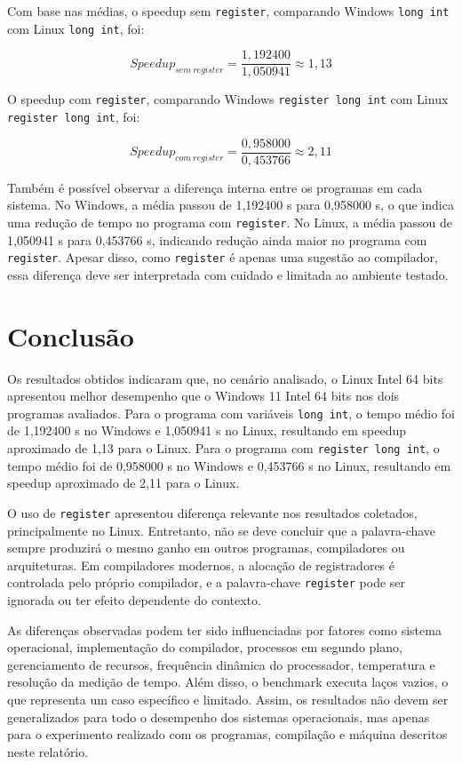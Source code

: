 \documentclass[12pt,oneside,a4paper,brazil]{abntex2}
\begin{document}
Com base nas médias, o speedup sem \texttt{register}, comparando Windows \texttt{long int} com Linux \texttt{long int}, foi:

\begin{equation}
Speedup_{sem\ register} = \frac{1,192400}{1,050941} \approx 1,13
\end{equation}

O speedup com \texttt{register}, comparando Windows \texttt{register long int} com Linux \texttt{register long int}, foi:

\begin{equation}
Speedup_{com\ register} = \frac{0,958000}{0,453766} \approx 2,11
\end{equation}

Também é possível observar a diferença interna entre os programas em cada sistema. No Windows, a média passou de 1,192400 s para 0,958000 s, o que indica uma redução de tempo no programa com \texttt{register}. No Linux, a média passou de 1,050941 s para 0,453766 s, indicando redução ainda maior no programa com \texttt{register}. Apesar disso, como \texttt{register} é apenas uma sugestão ao compilador, essa diferença deve ser interpretada com cuidado e limitada ao ambiente testado.

\chapter{Conclusão}

Os resultados obtidos indicaram que, no cenário analisado, o Linux Intel 64 bits apresentou melhor desempenho que o Windows 11 Intel 64 bits nos dois programas avaliados. Para o programa com variáveis \texttt{long int}, o tempo médio foi de 1,192400 s no Windows e 1,050941 s no Linux, resultando em speedup aproximado de 1,13 para o Linux. Para o programa com \texttt{register long int}, o tempo médio foi de 0,958000 s no Windows e 0,453766 s no Linux, resultando em speedup aproximado de 2,11 para o Linux.

O uso de \texttt{register} apresentou diferença relevante nos resultados coletados, principalmente no Linux. Entretanto, não se deve concluir que a palavra-chave sempre produzirá o mesmo ganho em outros programas, compiladores ou arquiteturas. Em compiladores modernos, a alocação de registradores é controlada pelo próprio compilador, e a palavra-chave \texttt{register} pode ser ignorada ou ter efeito dependente do contexto.

As diferenças observadas podem ter sido influenciadas por fatores como sistema operacional, implementação do compilador, processos em segundo plano, gerenciamento de recursos, frequência dinâmica do processador, temperatura e resolução da medição de tempo. Além disso, o benchmark executa laços vazios, o que representa um caso específico e limitado. Assim, os resultados não devem ser generalizados para todo o desempenho dos sistemas operacionais, mas apenas para o experimento realizado com os programas, compilação e máquina descritos neste relatório.

\postextual

\end{document}
